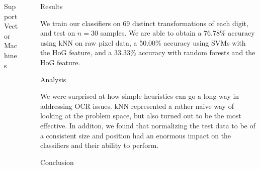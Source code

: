 \documentclass[final]{beamer}
\newlength{\sepwid}
\newlength{\onecolwid}
\newlength{\twocolwid}
\begin{document}
\begin{frame}[t]
\begin{columns}[t]
\begin{column}{\twocolwid}
\begin{columns}[t,totalwidth=\twocolwid]
\begin{column}{\onecolwid}
\begin{block}{Support Vector Machines}
\end{block}


\end{column} %

\end{columns} %

\end{column} %

\begin{column}{\sepwid}\end{column} %

\begin{column}{\onecolwid} %


\begin{block}{Results}

We train our classifiers on 69 distinct transformations of each digit, and test on $n=30$ samples. We are able to obtain a 76.78\% accuracy using kNN on raw pixel data, a 50.00\% accuracy using SVMs with the HoG feature, and a 33.33\% accuracy with random forests and the HoG feature.

\end{block}


\begin{block}{Analysis}

We were surprised at how simple heuristics can go a long way in addressing OCR issues. kNN represented a rather naive way of looking at the problem space, but also turned out to be the most effective. In additon, we found that normalizing the test data to be of a consistent size and position had an enormous impact on the classifiers and their ability to perform. 

\end{block}

\begin{block}{Conclusion}


\end{block}
\end{column}
\end{columns}
\end{frame}
\end{document}
